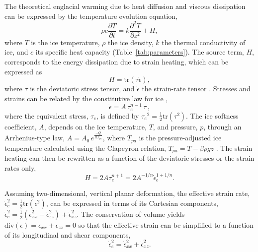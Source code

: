 \documentclass[utf8]{article}
\begin{document}
    The theoretical englacial warming due to heat diffusion and viscous
    dissipation can be expressed by the temperature evolution equation,
    \begin{equation}
      \rho c \frac{\partial T}{\partial t}
        = k \frac{\partial^2 T}{\partial z^2} + H,
    \end{equation}
    where $T$ is the ice temperature, $\rho$ the ice density, $k$ the
    thermal conductivity of ice, and $c$ its specific heat capacity
    (Table~\ref{tab:parameters}). The source term, $H$, corresponds to the
    energy dissipation due to strain heating, which can be expressed as
    \begin{equation}
      H = \mathrm{tr}(\tau\dot\epsilon),
    \end{equation}
    where $\tau$ is the deviatoric stress tensor, and $\dot\epsilon$ the
    strain-rate tensor \citep[p.~417]{Clarke.etal.1977, Cuffey.Paterson.2010}.
    Stresses and strains can be related by the constitutive law for ice
    \citep{Glen.1952, Nye.1953},
    \begin{equation}
        \dot{\epsilon} = A\,\tau_e^{n-1}\,\tau \,,
    \end{equation}
    where the equivalent stress, $\tau_e$, is defined by ${\tau_e}^2 =
    \frac{1}{2} \mathrm{tr}(\tau^2)$. The ice softness coefficient, $A$,
    depends on the ice temperature, $T$, and pressure, $p$,
    through an Arrhenius-type law, $A = A_0 \,e^\frac{-Q}{RT_{pa}}$, where
    $T_{pa}$ is the pressure-adjusted ice temperature calculated using
    the Clapeyron relation, ${T_{pa} = T - \beta \rho g z}$
    \citep[p.~72]{Cuffey.Paterson.2010}.
    The strain heating can then be rewritten as a function of the deviatoric
    stresses or the strain rates only,
    \begin{equation}
        H = 2 A \tau_e^{n+1} = 2 A^{-1/n} \dot\epsilon_e^{1+1/n}.
    \end{equation}

    Assuming two-dimensional, vertical planar deformation, the effective strain
    rate, $\dot\epsilon_e^2 = \frac{1}{2}\mathrm{tr}(\epsilon^2)$, can be
    expressed in terms of its Cartesian components, $\dot\epsilon_e^2 =
    \frac{1}{2}(\dot\epsilon_{xx}^2 + \dot\epsilon_{zz}^2) +
    \dot\epsilon_{xz}^2$. The conservation of volume yields
    $\mathrm{div}(\dot\epsilon) = \dot\epsilon_{xx} + \dot\epsilon_{zz} = 0$ so
    that the effective strain can be simplified to a function of its
    longitudinal and shear components,
    \begin{equation}
        \dot\epsilon_e^2 = \dot\epsilon_{xx}^2 + \dot\epsilon_{xz}^2.
    \end{equation}
\end{document}
